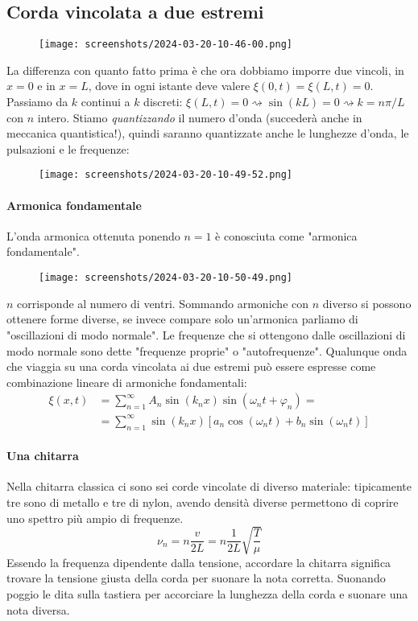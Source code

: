 \subsection{Corda vincolata a due estremi}
\begin{figure}[H]
	\centering
	\texttt{[image: screenshots/2024-03-20-10-46-00.png]}
\end{figure}
La differenza con quanto fatto prima è che ora dobbiamo imporre due vincoli, in \(x=0\) e in \(x=L\), dove in ogni istante deve valere \(\xi (0,t)=\xi (L,t)=0\). Passiamo da \(k\) continui a \(k\) discreti: \(\xi (L,t) = 0 \rightsquigarrow \sin (kL)=0\rightsquigarrow k=n \pi /L\) con \(n\) intero. Stiamo \emph{quantizzando} il numero d'onda (succederà anche in meccanica quantistica!), quindi saranno quantizzate anche le lunghezze d'onda, le pulsazioni e le frequenze:
\begin{figure}[H]
	\centering
	\texttt{[image: screenshots/2024-03-20-10-49-52.png]}
\end{figure}
\paragraph{Armonica fondamentale}
L'onda armonica ottenuta ponendo \(n=1\) è conosciuta come "armonica fondamentale".
\begin{figure}[H]
	\centering
	\texttt{[image: screenshots/2024-03-20-10-50-49.png]}
\end{figure}
\(n\) corrisponde al numero di ventri. Sommando armoniche con \(n\) diverso si possono ottenere forme diverse, se invece compare solo un'armonica parliamo di "oscillazioni di modo normale".
Le frequenze che si ottengono dalle oscillazioni di modo normale sono dette "frequenze proprie" o "autofrequenze". Qualunque onda che viaggia su una corda vincolata ai due estremi può essere espresse come combinazione lineare di armoniche fondamentali:
\begin{align}
	\xi (x,t)&=\sum_{n=1}^{\infty} A_n \sin (k_n x)\sin (\omega _n t + \varphi _n)=\\
	&= \sum_{n=1}^{\infty} \sin (k_n x)[a_n \cos (\omega _n t) + b_n \sin (\omega _n t)]\label{eq:fourier_standing}
\end{align}
\paragraph{Una chitarra}
Nella chitarra classica ci sono sei corde vincolate di diverso materiale: tipicamente tre sono di metallo e tre di nylon, avendo densità diverse permettono di coprire uno spettro più ampio di frequenze.
\[
	\nu _n = n \frac{v}{2L} = n \frac{1}{2L} \sqrt{\frac{T}{\mu }} 
\]
Essendo la frequenza dipendente dalla tensione, accordare la chitarra significa trovare la tensione giusta della corda per suonare la nota corretta. Suonando poggio le dita sulla tastiera per accorciare la lunghezza della corda e suonare una nota diversa.